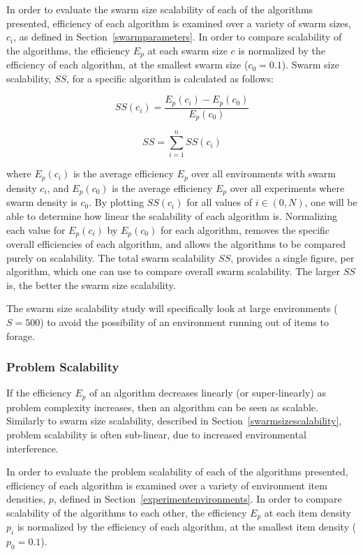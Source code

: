 In order to evaluate the swarm size scalability of each of the algorithms presented, efficiency of each algorithm is examined over a variety of swarm sizes, $c_i$, as defined in Section~\ref{swarmparameters}. In order to compare scalability of the algorithms, the efficiency $E_p$ at each swarm size $c$ is normalized by the efficiency of each algorithm, at the smallest swarm size ($c_0=0.1$). Swarm size scalability, $SS$, for a specific algorithm is calculated as follows:

\begin{equation}
	SS(c_i) = \dfrac{E_p(c_i)-E_p(c_0)}{E_p(c_0)}
\end{equation}

\begin{equation}
	SS = \sum_{i=1}^{n} SS(c_i)
\end{equation}

where $E_p(c_i)$ is the average efficiency $E_p$ over all environments with swarm density $c_i$, and $E_p(c_0)$ is the average efficiency $E_p$ over all experiments where swarm density is $c_0$. By plotting $SS(c_i)$ for all values of $i\in(0,N)$, one will be able to determine how linear the scalability of each algorithm is. Normalizing each value for $E_p(c_i)$ by $E_p(c_0)$ for each algorithm, removes the specific overall efficiencies of each algorithm, and allows the algorithms to be compared purely on scalability. The total swarm scalability $SS$, provides a single figure, per algorithm, which one can use to compare overall swarm scalability. The larger $SS$ is, the better the swarm size scalability. 

The swarm size scalability study will specifically look at large environments ($S=500$) to avoid the possibility of an environment running out of items to forage.


\subsubsection{Problem Scalability}
If the efficiency $E_p$ of an algorithm decreases linearly (or super-linearly) as problem complexity increases, then an algorithm can be seen as scalable. Similarly to swarm size scalability, described in Section~\ref{swarmsizescalability}, problem scalability is often sub-linear, due to increased environmental interference.

In order to evaluate the problem scalability of each of the algorithms presented, efficiency of each algorithm is examined over a variety of environment item densities, $p$, defined in Section~\ref{experimentenvironments}. In order to compare scalability of the algorithms to each other, the efficiency $E_p$ at each item density $p_i$ is normalized by the efficiency of each algorithm, at the smallest item density ($p_0=0.1$). 

